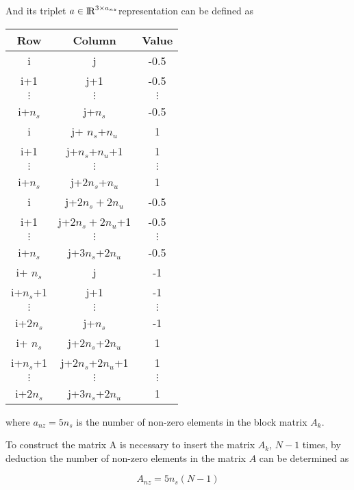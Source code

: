 \documentclass[12pt]{article}
\newcommand{\real}{\mbox{\rm I$\!$R}}
\begin{document}
\noindent And its triplet $a \in \real^{3\times a_{nz}}$representation can be defined as

\begin{table}[h]
\begin{center}
\begin{tabular}{c|c|c}
Row    & Column        & Value \\ \hline
i      & j             & -0.5    \\
i+1    & j+1           & -0.5    \\
$\vdots$ & $\vdots$   &    $\vdots$     \\
i+$n_s$ & j+$n_s$        & -0.5    \\
i      & j+ $n_s$+$n_u$  & 1     \\
i+1    & j+$n_s$+$n_u$+1 & 1     \\
 $\vdots$ & $\vdots$     &    $\vdots$     \\
i+$n_s$ & j+$2n_s$+$n_u$  & 1\\
i & j+$2n_s+2n_u$        & -0.5    \\
i+1 & j+$2n_s+2n_u$+1        & -0.5    \\
 $\vdots$ & $\vdots$     &    $\vdots$     \\
i+$n_s$    & j+$3n_s$+$2n_u$ & -0.5     \\
i+ $n_s$ & j        & -1    \\
i+$n_s$+1 & j+1        & -1    \\
 $\vdots$ & $\vdots$     &    $\vdots$     \\
i+$2n_s$    & j+$n_s$ & -1     \\
i+ $n_s$ & j+$2n_s$+$2n_u$        & 1    \\
i+$n_s$+1 & j+$2n_s$+$2n_u$+1        & 1    \\
 $\vdots$ & $\vdots$     &    $\vdots$     \\
i+$2n_s$    &j+$3n_s$+$2n_u$ & 1     \\
\end{tabular}
\end{center}
\end{table}

where $a_{nz}=5n_s$ is the number of non-zero elements in the block matrix $A_k$.

To construct the matrix A is necessary to insert the matrix $A_k$, $N-1$ times, by deduction the number of non-zero elements in the matrix $A$ can be determined as

\begin{equation}
    A_{nz}=5n_s(N-1)
\end{equation}
\end{document}
